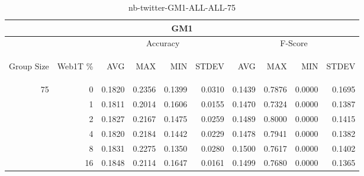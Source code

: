\begin{center}
\begin{table}[htbp]
\begin{center}
\begin{tabular}{ | r | r | r | r | r | r | r | r | r | r |}
\hline
\multicolumn{10}{|c|}{GM1}\\
\hline
 & & \multicolumn{4}{|c|}{Accuracy} & \multicolumn{4}{|c|}{F-Score}\\ \cline{3-10}
\begin{sideways}Group Size\end{sideways} & \begin{sideways}Web1T \%\end{sideways} & \begin{sideways}AVG\end{sideways} & \begin{sideways}MAX\end{sideways} & \begin{sideways}MIN\end{sideways} & \begin{sideways}STDEV\end{sideways} & \begin{sideways}AVG\end{sideways} & \begin{sideways}MAX\end{sideways} & \begin{sideways}MIN\end{sideways} & \begin{sideways}STDEV\end{sideways}\\
\hline
\multirow{5}{*}{75}
 & 0 & 0.1820 & 0.2356 & 0.1399 & 0.0310 & 0.1439 & 0.7876 & 0.0000 & 0.1695\\ \cline{2-10}
 & 1 & 0.1811 & 0.2014 & 0.1606 & 0.0155 & 0.1470 & 0.7324 & 0.0000 & 0.1387\\ \cline{2-10}
 & 2 & 0.1827 & 0.2167 & 0.1475 & 0.0259 & 0.1489 & 0.8000 & 0.0000 & 0.1415\\ \cline{2-10}
 & 4 & 0.1820 & 0.2184 & 0.1442 & 0.0229 & 0.1478 & 0.7941 & 0.0000 & 0.1382\\ \cline{2-10}
 & 8 & 0.1831 & 0.2275 & 0.1350 & 0.0280 & 0.1500 & 0.7617 & 0.0000 & 0.1402\\ \cline{2-10}
 & 16 & 0.1848 & 0.2114 & 0.1647 & 0.0161 & 0.1499 & 0.7680 & 0.0000 & 0.1365\\ \cline{2-10}
\hline
\end{tabular}
\caption{nb-twitter-GM1-ALL-ALL-75}
\label{table:nb-twitter-GM1-ALL-ALL-75}
\end{center}
\end{table}
\end{center}

